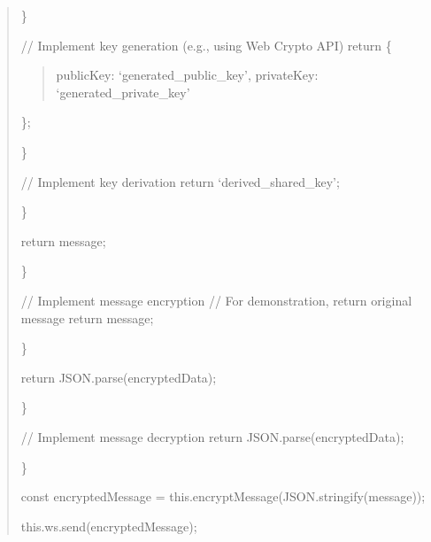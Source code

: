 \documentclass[letterpaper,10pt,english]{sphinxmanual}
\begin{document}
\begin{quote}
\begin{description}
\end{description}

\sphinxAtStartPar
\}
\begin{description}
\sphinxAtStartPar
// Implement key generation (e.g., using Web Crypto API)
return \{
\begin{quote}

\sphinxAtStartPar
publicKey: ‘generated\_public\_key’,
privateKey: ‘generated\_private\_key’
\end{quote}

\sphinxAtStartPar
\};

\end{description}

\sphinxAtStartPar
\}
\begin{description}
\sphinxAtStartPar
// Implement key derivation
return ‘derived\_shared\_key’;

\end{description}

\sphinxAtStartPar
\}
\begin{description}
\begin{description}
\sphinxAtStartPar
return message;

\end{description}

\sphinxAtStartPar
\}

\sphinxAtStartPar
// Implement message encryption
// For demonstration, return original message
return message;

\end{description}

\sphinxAtStartPar
\}
\begin{description}
\begin{description}
\sphinxAtStartPar
return JSON.parse(encryptedData);

\end{description}

\sphinxAtStartPar
\}

\sphinxAtStartPar
// Implement message decryption
return JSON.parse(encryptedData);

\end{description}

\sphinxAtStartPar
\}
\begin{description}
\sphinxAtStartPar
const encryptedMessage = this.encryptMessage(JSON.stringify(message));
\begin{description}
\sphinxAtStartPar
this.ws.send(encryptedMessage);


\end{description}
\end{description}
\end{quote}
\end{document}
